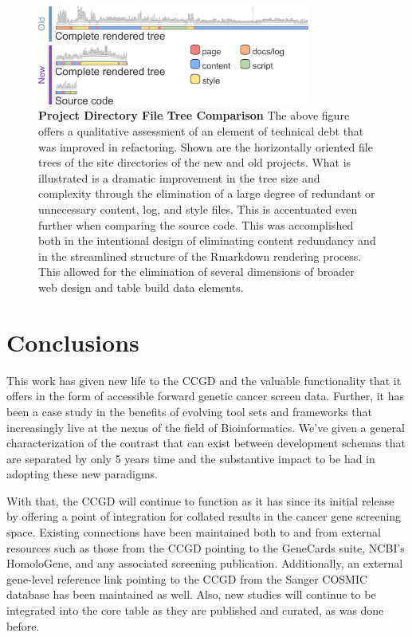 \documentclass[10pt]{report}
\begin{document}
\begin{figure}[H]
    \center{}
    \includegraphics[width=0.8\textwidth]{fig/file_tree.pdf}
    \caption[Project Directory File Tree Comparison]{\textbf{Project Directory File Tree Comparison} The above figure offers a qualitative assessment of an element of technical debt that was improved in refactoring. Shown are the horizontally oriented file trees of the site directories of the new and old projects. What is illustrated is a dramatic improvement in the tree size and complexity through the elimination of a large degree of redundant or unnecessary content, log, and style files. This is accentuated even further when comparing the source code. This was accomplished both in the intentional design of eliminating content redundancy and in the streamlined structure of the Rmarkdown rendering process. This allowed for the elimination of several dimensions of broader web design and table build data elements.}\label{fig:fileTree}
\end{figure}




\chapter{Conclusions}
This work has given new life to the CCGD and the valuable functionality that it offers in the form of accessible forward genetic cancer screen data. Further, it has been a case study in the benefits of evolving tool sets and frameworks that increasingly live at the nexus of the field of Bioinformatics. We've given a general characterization of the contrast that can exist between development schemas that are separated by only 5 years time and the substantive impact to be had in adopting these new paradigms.

With that, the CCGD will continue to function as it has since its initial release by offering a point of integration for collated results in the cancer gene screening space. Existing connections have been maintained both to and from external resources such as those from the CCGD pointing to the GeneCards suite, NCBI's HomoloGene, and any associated screening publication. Additionally, an external gene-level reference link pointing to the CCGD from the Sanger COSMIC database has been maintained as well. Also, new studies will continue to be integrated into the core table as they are published and curated, as was done before.
\end{document}
